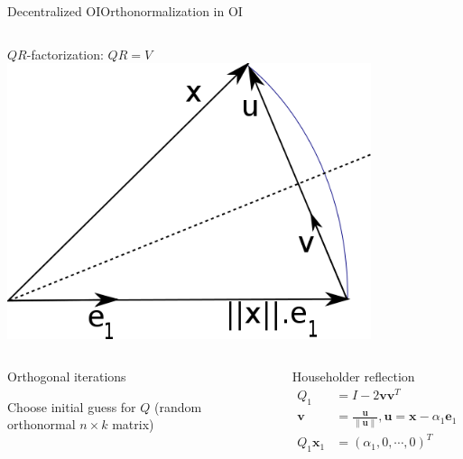 \documentclass[xcolor=table,final]{beamer} %
\begin{document}
\begin{frame}{Decentralized OI}{Orthonormalization in OI}
  \begin{columns}
    $QR$-factorization: $QR = V$
    \includegraphics[width=0.8\textwidth]{figs/extras/householder-reflection}%
  \end{columns}

  \begin{columns}
    \begin{block}{Orthogonal iterations}
      \begin{algorithm}[H]
        \BlankLine

        Choose initial guess for $Q$ {\small (random orthonormal $n \times k$ matrix)} \;

      \end{algorithm}
    \end{block}

    \begin{block}{Householder reflection}
      \begin{align*}
        Q_1 &= I - 2 \mathbf{v}\mathbf{v}^T \\
        \mathbf{v} &= \frac{\mathbf{u}}{\|\mathbf{u}\|}, 
                     \mathbf{u} = \mathbf{x} - \alpha_1\mathbf{e}_1 \\
        Q_1\mathbf{x}_1 &= (\alpha_1, 0, \cdots, 0)^T
      \end{align*}
  \end{block}
  \end{columns}
\end{frame}
\end{document}
